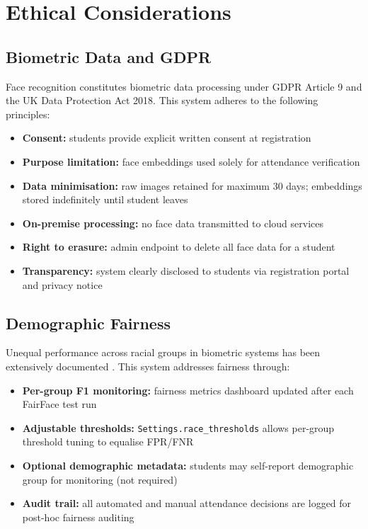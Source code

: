 \documentclass[12pt,a4paper]{report}
\begin{document}
\chapter{Ethical Considerations}
\label{chap:ethics}

\section{Biometric Data and GDPR}
Face recognition constitutes biometric data processing under GDPR Article 9 and the UK Data Protection Act 2018. This system adheres to the following principles:

\begin{itemize}
  \item \textbf{Consent:} students provide explicit written consent at registration
  \item \textbf{Purpose limitation:} face embeddings used solely for attendance verification
  \item \textbf{Data minimisation:} raw images retained for maximum 30 days; embeddings stored indefinitely until student leaves
  \item \textbf{On-premise processing:} no face data transmitted to cloud services
  \item \textbf{Right to erasure:} admin endpoint to delete all face data for a student
  \item \textbf{Transparency:} system clearly disclosed to students via registration portal and privacy notice
\end{itemize}

\section{Demographic Fairness}
Unequal performance across racial groups in biometric systems has been extensively documented \cite{buolamwini2018gender,grother2019frvt}. This system addresses fairness through:

\begin{itemize}
  \item \textbf{Per-group F1 monitoring:} fairness metrics dashboard updated after each FairFace test run
  \item \textbf{Adjustable thresholds:} \texttt{Settings.race\_thresholds} allows per-group threshold tuning to equalise FPR/FNR
  \item \textbf{Optional demographic metadata:} students may self-report demographic group for monitoring (not required)
  \item \textbf{Audit trail:} all automated and manual attendance decisions are logged for post-hoc fairness auditing
\end{itemize}
\end{document}
